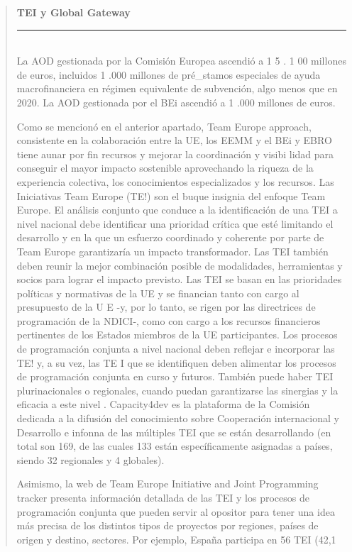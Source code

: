 \documentclass[10pt,a4paper]{article}
\newenvironment{specialblock}[1]{%
      \begin{quote} %
      \small %
      \noindent\textbf{#1}\\[-0.3em] %
      \rule{\linewidth}{0.4pt}\\[0.6em]}{
      \end{quote}}
\begin{document}
\begin{specialblock}{TEI y Global Gateway}
    La AOD gestionada por la Comisión Europea ascendió a 1 5 . 1 00 millones de euros, incluidos 1 .000 millones de pré_stamos especiales de ayuda macrofinanciera en régimen equivalente de subvención, algo menos que en 2020. La AOD gestionada por el BEi ascendió a 1 .000 millones de euros.
    
    Como se mencionó en el anterior apartado, Team Europe approach, consistente en la colaboración entre la UE, los EEMM y el BEi y EBRO tiene aunar por fin recursos y mejorar la coordinación y visibi lidad para conseguir el mayor impacto sostenible aprovechando la riqueza de la experiencia colectiva, los conocimientos especializados y los recursos. Las Iniciativas Team Europe (TE!) son el buque insignia del enfoque Team Europe. El análisis conjunto que conduce a la identificación de una TEI a nivel nacional debe identificar una prioridad crítica que esté limitando el desarrollo y en la que un esfuerzo coordinado y coherente por parte de Team Europe garantizaría un impacto transformador. Las TEI también deben reunir la mejor combinación posible de modalidades, herramientas y socios para lograr el impacto previsto. Las TEI se basan en las prioridades políticas y normativas de la UE y se financian tanto con cargo al presupuesto de la U E -y, por lo tanto, se rigen por las directrices de programación de la NDICI-, como con cargo a los recursos financieros pertinentes de los Estados miembros de la UE participantes. Los procesos de programación conjunta a nivel nacional deben reflejar e incorporar las TE! y, a su     vez, las TE I que se identifiquen deben alimentar los procesos de programación conjunta en curso y futuros. También puede haber TEI plurinacionales o regionales, cuando puedan garantizarse las sinergias y la eficacia a este nivel . Capacity4dev es la plataforma de la Comisión dedicada a la difusión del conocimiento sobre Cooperación internacional y Desarrollo e infonna de las múltiples TEI que se están desarrollando (en total son 169, de las cuales 133 están específicamente asignadas a países, siendo 32 regionales y 4 globales). 

    Asimismo, la web de Team Europe Initiative and Joint Programming tracker presenta información detallada de las TEI y los procesos de programación conjunta que pueden servir al opositor para tener una idea más precisa de los distintos tipos de proyectos por regiones, países de origen y destino, sectores. Por ejemplo, España participa en 56 TEI (42,1 %


\end{specialblock}
\end{document}
